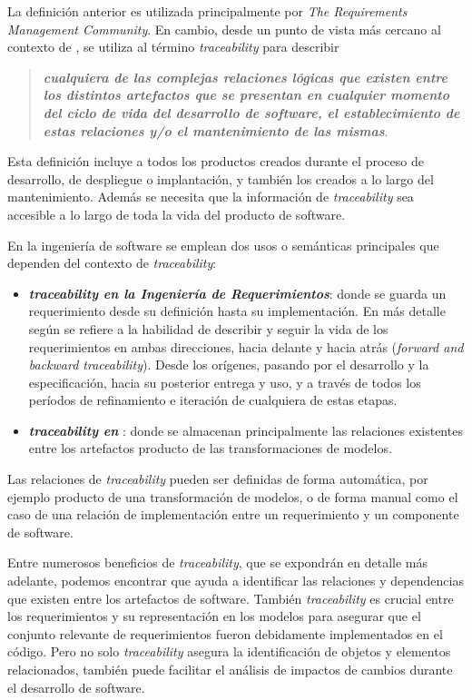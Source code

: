 \documentclass[a4paper,12pt,oneside,spanish]{book}
\begin{document}
La definición anterior es utilizada principalmente por \textit{The Requirements Management Community}. En cambio, desde un punto de vista más cercano al contexto de , se utiliza al término \textit{traceability} para describir 
\begin{quote}
\small \textit{\textbf{cualquiera de las complejas relaciones lógicas que existen entre los distintos artefactos que se presentan en cualquier momento del ciclo de vida del desarrollo de software, el establecimiento de estas relaciones y/o el mantenimiento de las mismas}}.
\end{quote}

Esta definición incluye a todos los productos creados durante el proceso de desarrollo, de despliegue o implantación, y también los creados a lo largo del mantenimiento. Además se necesita que la información de \textit{traceability} sea accesible a lo largo de toda la vida del producto de software.


En la ingeniería de software se emplean dos usos o semánticas principales que dependen del contexto de \textit{traceability}:

\begin{itemize}

\item \textit{\textbf{traceability en la Ingeniería de Requerimientos}}: donde se guarda un requerimiento desde su definición hasta su implementación. En más detalle según \cite{GotelFinkelstein} se refiere a la habilidad de describir y seguir la vida de los requerimientos en ambas direcciones, hacia delante y hacia atrás (\textit{forward and backward traceability}). Desde los orígenes, pasando por el desarrollo y la especificación, hacia su posterior entrega y uso, y a través de todos los períodos de refinamiento e iteración de cualquiera de estas etapas.

\item \textit{\textbf{traceability en }}: donde se almacenan principalmente las relaciones existentes entre los artefactos producto de las transformaciones de modelos.

\end{itemize}


Las relaciones de \textit{traceability} pueden ser definidas de forma automática, por ejemplo producto de una transformación de modelos, o de forma manual como el caso de una relación de implementación entre un requerimiento y un componente de software.

Entre numerosos beneficios de \textit{traceability}, que se expondrán en detalle más adelante, podemos encontrar que ayuda a identificar las relaciones y dependencias que existen entre los artefactos de software. También \textit{traceability} es crucial entre los requerimientos y su representación en los modelos para asegurar que el conjunto relevante de requerimientos fueron debidamente implementados en el código. Pero no solo \textit{traceability} asegura la identificación de objetos y elementos relacionados, también puede facilitar el análisis de impactos de cambios durante el desarrollo de software.
\end{document}

